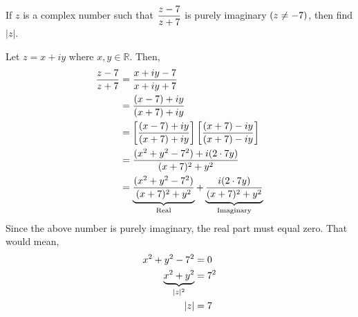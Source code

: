 

\question If $z$ is a complex number such that $\dfrac{z-7}{z+7}$ 
is purely imaginary $(z\neq - 7)$, then find $|z|$.

\watchout

\begin{solution}
  Let $z=x+iy$ where $x,y\in \mathbb{R}$. Then,
  \begin{align}
    \dfrac{z-7}{z+7} &= \dfrac{x+iy-7}{x+iy+7}\\
                         &= \dfrac{(x-7)+iy}{(x+7)+iy}\\
                         &= \left[\dfrac{(x-7)+iy}{(x+7)+iy}\right]
                            \left[\dfrac{(x+7)-iy}{(x+7)-iy}\right]\\
                         &= \dfrac{(x^2+y^2-7^2)+i(2\cdot7 y)}{(x+7)^2+y^2}\\
                         &= \underbrace{\dfrac{(x^2+y^2-7^2)}{(x+7)^2+y^2}}_{\text{Real}} +
                            \underbrace{\dfrac{i(2\cdot7 y)}{(x+7)^2+y^2}}_{\text{Imaginary}}
  \end{align}
  Since the above number is purely imaginary, the real part must 
  equal zero. That would mean,
  \begin{align}
    x^2+y^2-7^2 &= 0\\
    \underbrace{x^2+y^2}_{|z|^2}&= 7^2\\
    |z| &= 7
  \end{align}

\end{solution}

